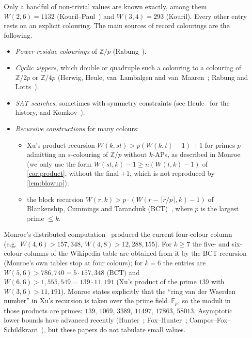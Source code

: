 \documentclass[11pt]{article}
\numberwithin{equation}{section}
\theoremstyle{definition}
\theoremstyle{remark}
\newcommand{\Z}{\mathbb Z}
\newcommand{\W}{W}
\begin{document}
Only a handful of non-trivial values are known exactly, among them $\W(2,6)=1132$
(Kouril--Paul~\cite{KP08}) and $\W(3,4)=293$ (Kouril).  Every other entry rests on an explicit
colouring.  The main sources of record colourings are the following.
\begin{itemize}
\item \emph{Power-residue colourings} of $\Z/p$ (Rabung~\cite{Rab79}).
\item \emph{Cyclic zippers}, which double or quadruple such a colouring to a colouring of
  $\Z/2p$ or $\Z/4p$ (Herwig, Heule, van~Lambalgen and van~Maaren~\cite{HHLM07};
  Rabung and Lotts~\cite{RL12}).
\item \emph{SAT searches}, sometimes with symmetry constraints (see Heule~\cite{Heu17} for the
  history, and Komkov~\cite{Kom20}).
\item \emph{Recursive constructions} for many colours:
  \begin{itemize}
  \item Xu's product recursion $\W(k,st)>p(\W(k,t)-1)+1$ for primes $p$ admitting an
    $s$-colouring of $\Z/p$ without $k$-APs, as described in Monroe~\cite{Mon22,Mon25}
    (we only use the form $\W(st,k)-1\ge n(\W(t,k)-1)$ of \cref{cor:product}, without the
    final $+1$, which is not reproduced by \cref{lem:blowup});
  \item the block recursion $\W(r,k)>p\cdot(\W(r-\lceil r/p\rceil,k)-1)$ of Blankenship,
    Cummings and Taranchuk (BCT)~\cite{BCT18}, where $p$ is the largest prime $\le k$.
  \end{itemize}
\end{itemize}
Monroe's distributed computation~\cite{Mon22,Mon25} produced the current four-colour column
(e.g.\ $\W(4,6)>157{,}348$, $\W(4,8)>12{,}288{,}155$).  For $k\ge7$ the five- and six-colour
columns of the Wikipedia table are obtained from it by the BCT recursion (Monroe's own tables
stop at four colours); for $k=6$ the entries are $\W(5,6)>786{,}740=5\cdot157{,}348$ (BCT) and
$\W(6,6)>1{,}555{,}549=139\cdot11{,}191$ (Xu's product of the prime $139$ with
$\W(3,6)>11{,}191$).  Monroe states
explicitly that the ``ring van der Waerden number'' in Xu's recursion is taken over the prime
field~$\mathbb F_p$, so the moduli in those products are primes: $139$, $1069$, $3389$,
$11497$, $17863$, $58013$.  Asymptotic lower bounds have advanced recently
(Hunter~\cite{Hun23}; Fox--Hunter~\cite{Fox26}; Campos--Fox--Schildkraut~\cite{Schild26}), but these papers do not tabulate small
values.
\end{document}

